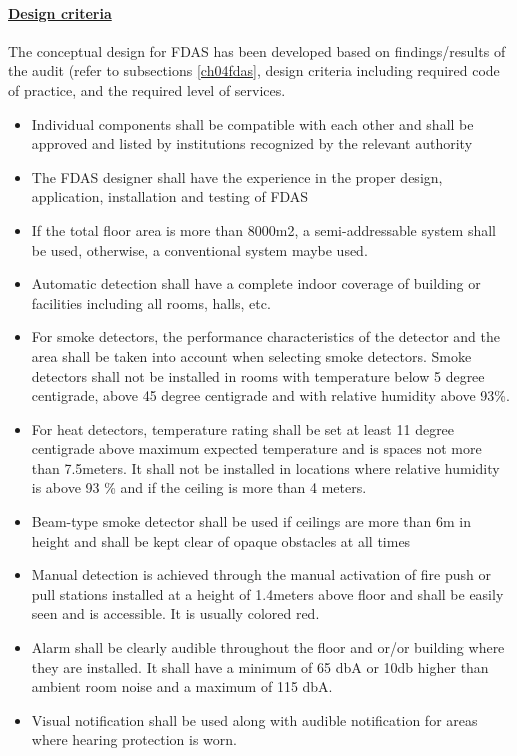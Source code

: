 \paragraph{\underline{Design criteria}}
The conceptual design for FDAS has been developed based on findings/results of the audit (refer to subsections \ref{ch04fdas}, design criteria including required code of practice, and the required level of services.
\begin{itemize}
\item Individual components shall be compatible with each other and shall be approved and listed by institutions recognized by the relevant authority
\item The FDAS designer shall have the experience in the proper design, application, installation and testing of FDAS
\item If the total floor area is more than 8000m2, a semi-addressable system shall be used, otherwise, a conventional system maybe used.
\item  Automatic detection shall have a complete indoor coverage of building or facilities including all rooms, halls, etc.
\item  For smoke detectors, the performance characteristics of the detector and the area shall be taken into account when selecting smoke detectors. Smoke detectors shall not be installed in rooms with temperature below 5 degree centigrade, above 45 degree centigrade and with relative humidity above 93\%.
\item  For heat detectors, temperature rating shall be set at least 11 degree centigrade above maximum expected temperature and is spaces not more than 7.5meters. It shall not be installed in locations where relative humidity is above 93 \% and if the ceiling is more than 4 meters.
\item  Beam-type smoke detector shall be used if ceilings are more than 6m in height and shall be kept clear of opaque obstacles at all times
\item  Manual detection is achieved through the manual activation of fire push or pull stations installed at a height of 1.4meters above floor and shall be easily seen and is accessible. It is usually colored red.
\item  Alarm shall be clearly audible throughout the floor and or/or building where they are installed. It shall have a minimum of 65 dbA or 10db higher than ambient room noise and a maximum of 115 dbA.
\item  Visual notification shall be used along with audible notification for areas where hearing protection is worn.
\end{itemize}

